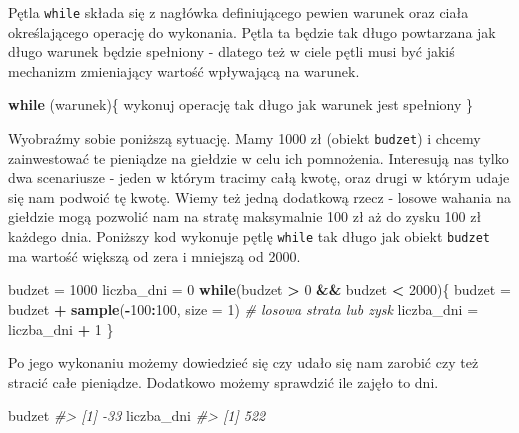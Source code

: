 \documentclass[paper=6in:9in,pagesize=pdftex,headinclude=on,footinclude=on,10pt]{scrbook}
\newenvironment{Shaded}{\begin{snugshade}}{\end{snugshade}}
\newcommand{\CommentTok}[1]{\textcolor[rgb]{0.56,0.35,0.01}{\textit{#1}}}
\newcommand{\ControlFlowTok}[1]{\textcolor[rgb]{0.13,0.29,0.53}{\textbf{#1}}}
\newcommand{\DataTypeTok}[1]{\textcolor[rgb]{0.13,0.29,0.53}{#1}}
\newcommand{\DecValTok}[1]{\textcolor[rgb]{0.00,0.00,0.81}{#1}}
\newcommand{\KeywordTok}[1]{\textcolor[rgb]{0.13,0.29,0.53}{\textbf{#1}}}
\newcommand{\NormalTok}[1]{#1}
\newcommand{\OperatorTok}[1]{\textcolor[rgb]{0.81,0.36,0.00}{\textbf{#1}}}
\newcommand{\StringTok}[1]{\textcolor[rgb]{0.31,0.60,0.02}{#1}}
\begin{document}
Pętla \texttt{while} składa się z nagłówka definiującego pewien warunek oraz ciała określającego operację do wykonania.
Pętla ta będzie tak długo powtarzana jak długo warunek będzie spełniony - dlatego też w ciele pętli musi być jakiś mechanizm zmieniający wartość wpływającą na warunek.

\begin{Shaded}
\begin{Highlighting}[]
\ControlFlowTok{while}\NormalTok{ (warunek)\{}
\NormalTok{    wykonuj operację tak długo jak warunek jest spełniony}
\NormalTok{\}}
\end{Highlighting}
\end{Shaded}

Wyobraźmy sobie poniższą sytuację.
Mamy 1000 zł (obiekt \texttt{budzet}) i chcemy zainwestować te pieniądze na giełdzie w celu ich pomnożenia.
Interesują nas tylko dwa scenariusze - jeden w którym tracimy całą kwotę, oraz drugi w którym udaje się nam podwoić tę kwotę.
Wiemy też jedną dodatkową rzecz - losowe wahania na giełdzie mogą pozwolić nam na stratę maksymalnie 100 zł aż do zysku 100 zł każdego dnia.
Poniższy kod wykonuje pętlę \texttt{while} tak długo jak obiekt \texttt{budzet} ma wartość większą od zera i mniejszą od 2000.

\begin{Shaded}
\begin{Highlighting}[]
\NormalTok{budzet =}\StringTok{ }\DecValTok{1000}
\NormalTok{liczba_dni =}\StringTok{ }\DecValTok{0}
\ControlFlowTok{while}\NormalTok{(budzet }\OperatorTok{>}\StringTok{ }\DecValTok{0} \OperatorTok{&&}\StringTok{ }\NormalTok{budzet }\OperatorTok{<}\StringTok{ }\DecValTok{2000}\NormalTok{)\{}
\NormalTok{  budzet =}\StringTok{ }\NormalTok{budzet }\OperatorTok{+}\StringTok{ }\KeywordTok{sample}\NormalTok{(}\OperatorTok{-}\DecValTok{100}\OperatorTok{:}\DecValTok{100}\NormalTok{, }\DataTypeTok{size =} \DecValTok{1}\NormalTok{) }\CommentTok{# losowa strata lub zysk}
\NormalTok{  liczba_dni =}\StringTok{ }\NormalTok{liczba_dni }\OperatorTok{+}\StringTok{ }\DecValTok{1}
\NormalTok{\}}
\end{Highlighting}
\end{Shaded}

Po jego wykonaniu możemy dowiedzieć się czy udało się nam zarobić czy też stracić całe pieniądze.
Dodatkowo możemy sprawdzić ile zajęło to dni.

\begin{Shaded}
\begin{Highlighting}[]
\NormalTok{budzet}
\CommentTok{#> [1] -33}
\NormalTok{liczba_dni}
\CommentTok{#> [1] 522}
\end{Highlighting}
\end{Shaded}
\end{document}
